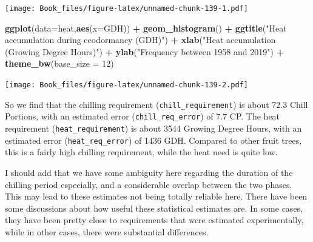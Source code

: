 \documentclass[
]{book}
\newenvironment{Shaded}{\begin{snugshade}}{\end{snugshade}}
\newcommand{\DataTypeTok}[1]{\textcolor[rgb]{0.13,0.29,0.53}{#1}}
\newcommand{\DecValTok}[1]{\textcolor[rgb]{0.00,0.00,0.81}{#1}}
\newcommand{\KeywordTok}[1]{\textcolor[rgb]{0.13,0.29,0.53}{\textbf{#1}}}
\newcommand{\NormalTok}[1]{#1}
\newcommand{\OperatorTok}[1]{\textcolor[rgb]{0.81,0.36,0.00}{\textbf{#1}}}
\newcommand{\StringTok}[1]{\textcolor[rgb]{0.31,0.60,0.02}{#1}}
\begin{document}
\texttt{[image: Book\_files/figure-latex/unnamed-chunk-139-1.pdf]}

\begin{Shaded}
\begin{Highlighting}[]
\KeywordTok{ggplot}\NormalTok{(}\DataTypeTok{data=}\NormalTok{heat,}\KeywordTok{aes}\NormalTok{(}\DataTypeTok{x=}\NormalTok{GDH)) }\OperatorTok{+}
\StringTok{  }\KeywordTok{geom_histogram}\NormalTok{() }\OperatorTok{+}
\StringTok{  }\KeywordTok{ggtitle}\NormalTok{(}\StringTok{"Heat accumulation during ecodormancy (GDH)"}\NormalTok{) }\OperatorTok{+}
\StringTok{  }\KeywordTok{xlab}\NormalTok{(}\StringTok{"Heat accumulation (Growing Degree Hours)"}\NormalTok{) }\OperatorTok{+}
\StringTok{  }\KeywordTok{ylab}\NormalTok{(}\StringTok{"Frequency between 1958 and 2019"}\NormalTok{) }\OperatorTok{+}
\StringTok{  }\KeywordTok{theme_bw}\NormalTok{(}\DataTypeTok{base_size =} \DecValTok{12}\NormalTok{)}
\end{Highlighting}
\end{Shaded}

\texttt{[image: Book\_files/figure-latex/unnamed-chunk-139-2.pdf]}

\begin{Shaded}
\end{Shaded}

So we find that the chilling requirement (\texttt{chill\_requirement}) is about 72.3 Chill Portions, with an estimated error (\texttt{chill\_req\_error}) of 7.7 CP. The heat requirement (\texttt{heat\_requirement}) is about 3544 Growing Degree Hours, with an estimated error (\texttt{heat\_req\_error}) of 1436 GDH. Compared to other fruit trees, this is a fairly high chilling requirement, while the heat need is quite low.

I should add that we have some ambiguity here regarding the duration of the chilling period especially, and a considerable overlap between the two phases. This may lead to these estimates not being totally reliable here. There have been some discussions about how useful these statistical estimates are. In some cases, they have been pretty close to requirements that were estimated experimentally, while in other cases, there were substantial differences.
\end{document}
